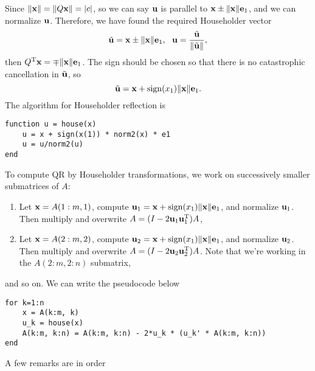 \documentclass{article}
\begin{document}
Since $\lVert\bm{\mathrm{x}}\rVert=\lVert Q\bm{\mathrm{x}}\rVert=|c|$, so we can say $\bm{\mathrm{u}}$ is parallel to $\bm{\mathrm{x}}\pm\lVert\bm{\mathrm{x}}\rVert\bm{\mathrm{e}}_1$, and we can normalize $\bm{\mathrm{u}}$. Therefore, we have found the required Householder vector
\begin{equation}
    \tilde{\bvec{u}}=\bvec{x}\pm\lVert\bvec{x}\rVert\bvec{e}_1,\ \ \bvec{u}=\frac{\tilde{\bvec{u}}}{\lVert\tilde{\bvec{u}}\rVert},
\end{equation}
then $Q^{\text{T}}\bm{\mathrm{x}}=\mp\lVert\bm{\mathrm{x}}\rVert\bm{\mathrm{e}}_1$. The sign should be chosen so that there is no catastrophic cancellation in $\tilde{\bm{\mathrm{u}}}$, so 
\begin{equation}
    \tilde{\bm{\mathrm{u}}}=\bm{\mathrm{x}}+\operatorname{sign}(x_1)\lVert\bm{\mathrm{x}}\rVert\bm{\mathrm{e}}_1.
\end{equation}
The algorithm for Householder reflection is
\begin{verbatim}
function u = house(x)
    u = x + sign(x(1)) * norm2(x) * e1
    u = u/norm2(u)
end
\end{verbatim}
To compute QR by Householder transformations, we work on successively smaller submatrices of $A$:
\begin{enumerate}
    \item Let $\bm{\mathrm{x}}=A(1:m,1)$, compute $\bm{\mathrm{u}}_1=\bm{\mathrm{x}}+\operatorname{sign}(x_1)\lVert\bm{\mathrm{x}}\rVert\bm{\mathrm{e}}_1$, and normalize $\bm{\mathrm{u}}_1$. Then multiply and overwrite $A=(I-2\bm{\mathrm{u}}_1\bm{\mathrm{u}}_1^{\text{T}})A$,
    \item Let $\bm{\mathrm{x}}=A(2:m,2)$, compute $\bm{\mathrm{u}}_2=\bm{\mathrm{x}}+\operatorname{sign}(x_1)\lVert\bm{\mathrm{x}}\rVert\bm{\mathrm{e}}_1$, and normalize $\bm{\mathrm{u}}_2$. Then multiply and overwrite $A=(I-2\bm{\mathrm{u}}_2\bm{\mathrm{u}}_2^{\text{T}})A$. Note that we're working in the $A(2:m,2:n)$ submatrix,
\end{enumerate}
and so on. We can write the pseudocode below
\begin{verbatim}
for k=1:n
    x = A(k:m, k)
    u_k = house(x)
    A(k:m, k:n) = A(k:m, k:n) - 2*u_k * (u_k' * A(k:m, k:n))
end
\end{verbatim}
A few remarks are in order
\end{document}
